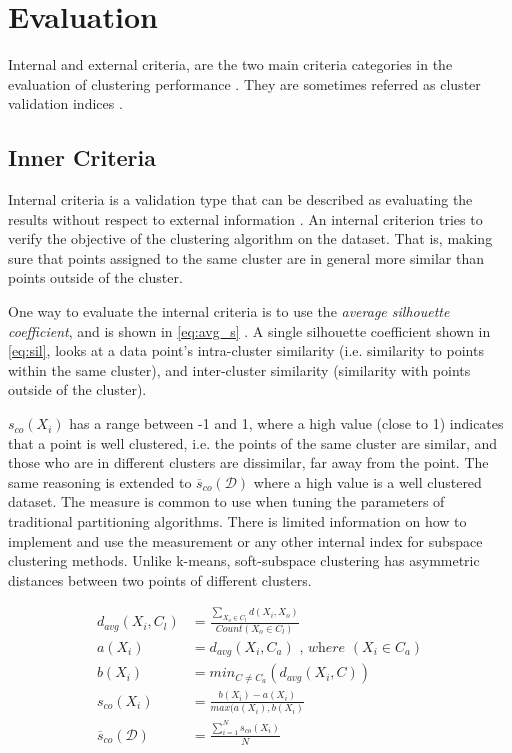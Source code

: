 \documentclass[../report.tex]{subfiles}
\begin{document}
\section{Evaluation}
Internal and external criteria, are the two main criteria categories in the evaluation of clustering performance \cite{manning2010introduction}. They are sometimes referred as cluster validation indices \cite{Halkidi2002}.

\subsection{Inner Criteria} \label{sec:Internal}
Internal criteria is a validation type that can be described as evaluating the results without respect to external information \cite{Halkidi2002}. An internal criterion tries to verify the objective of the clustering algorithm on the dataset. That is, making sure that points assigned to the same cluster are in general more similar than points outside of the cluster.

One way to evaluate the internal criteria is to use the \textit{average silhouette coefficient}, and is shown in \cref{eq:avg_s} \cite{ROUSSEEUW198753}. A single silhouette coefficient shown in \cref{eq:sil}, looks at a data point's intra-cluster similarity (i.e. similarity to points within the same cluster), and inter-cluster similarity (similarity with points outside of the cluster).

${s}_{co}(X_i)$ has a range between -1 and 1, where a high value (close to 1) indicates that a point is well clustered, i.e. the points of the same cluster are similar, and those who are in different clusters are dissimilar, far away from the point. The same reasoning is extended to $\overline{s}_{co}(\mathcal{D})$ where a high value is a well clustered dataset. The measure is common to use when tuning the parameters of traditional partitioning algorithms. There is limited information on how to implement and use the measurement or any other internal index for subspace clustering methods. Unlike k-means, soft-subspace clustering has asymmetric distances between two points of different clusters.

\begin{align}
  d_{avg}(X_i,C_l) &= \frac{\sum_{X_o \in C_l}d(X_i,X_o)}{Count(X_o \in C_l)} \\
  a(X_i) &= d_{avg}(X_i,C_a) \textit{ , where } (X_i \in C_a) \\
  b(X_i) &= min_{C \neq C_a}(d_{avg}(X_i,C)) \\
 \label{eq:sil}
  s_{co}(X_i) &= \frac{b(X_i) - a(X_i)}{max(a(X_i), b(X_i)} \\
\label{eq:avg_s}
  \overline{s}_{co}(\mathcal{D}) &= \frac{\sum^{N}_{i=1} s_{co}(X_i)}{N}
\end{align}
\end{document}
